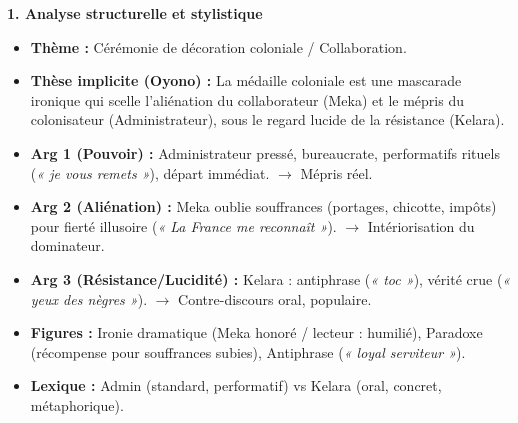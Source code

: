 \documentclass[11pt]{article}
\begin{document}
\begin{corrige}
\textbf{1. Analyse structurelle et stylistique}
\begin{itemize}
    \item \textbf{Thème :} Cérémonie de décoration coloniale / Collaboration.
    \item \textbf{Thèse implicite (Oyono) :} La médaille coloniale est une mascarade ironique qui scelle l'aliénation du collaborateur (Meka) et le mépris du colonisateur (Administrateur), sous le regard lucide de la résistance (Kelara).
    \item \textbf{Arg 1 (Pouvoir) :} Administrateur pressé, bureaucrate, performatifs rituels (\emph{« je vous remets »}), départ immédiat. $\rightarrow$ Mépris réel.
    \item \textbf{Arg 2 (Aliénation) :} Meka oublie souffrances (portages, chicotte, impôts) pour fierté illusoire (\emph{« La France me reconnaît »}). $\rightarrow$ Intériorisation du dominateur.
    \item \textbf{Arg 3 (Résistance/Lucidité) :} Kelara : antiphrase (\emph{« toc »}), vérité crue (\emph{« yeux des nègres »}). $\rightarrow$ Contre-discours oral, populaire.
    \item \textbf{Figures :} Ironie dramatique (Meka honoré / lecteur : humilié), Paradoxe (récompense pour souffrances subies), Antiphrase (\emph{« loyal serviteur »}).
    \item \textbf{Lexique :} Admin (standard, performatif) vs Kelara (oral, concret, métaphorique).
\end{itemize}


\end{corrige}
\end{document}
